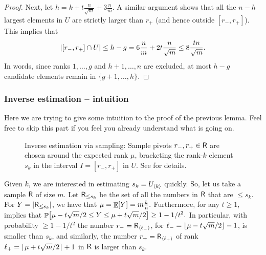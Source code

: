 \begin{proof}
    Next, let $h= k + t \frac{n}{\sqrt{m}} +3\frac{n}{m}$. A similar
    argument shows that all the $n-h$ largest elements in $U$ are
    strictly larger than $r_+$ (and hence outside $[r_-, r_+]$).  This
    implies that
    \begin{equation*}
      \cardin{[r_-, r_+] \cap U} \leq h-g = 6 \frac{n}{m} + 2t
      \frac{n}{\sqrt{m}}%
      \leq%
      8 \frac{tn}{\sqrt{m}}.
  \end{equation*}
  In words, since ranks $1,\dots,g$ and $h+1,\dots,n$ are excluded, at
  most $h-g$ candidate elements remain in $\{g+1,\dots,h\}$.
\end{proof}

\subsubsection{Inverse estimation -- intuition}

Here we are trying to give some intuition to the proof of the previous
lemma. Feel free to skip this part if you feel you already understand
what is going on.

\begin{figure}[t]
    \centering
    \caption{Inverse estimation via sampling: Sample pivots $r_-,
      r_+ \in \mathsf{R}$ are chosen around the expected rank $\mu$,
      bracketing the rank-$k$ element $s_k$ in the interval $I = [r_-,
      r_+]$ in $U$. See  for details.}
\end{figure}


Given $k$, we are interested in estimating $s_k = U_{\langle k\rangle}$
quickly. So, let us take a sample $\mathsf{R}$ of size $m$. Let
$\mathsf{R}_{\leq s_k}$ be the set of all the numbers in $\mathsf{R}$ that
are $\leq s_k$. For $Y = \left| {\mathsf{R}_{\leq s_k}} \right|$, we have that
\begin{math}
  \mu = \mathop{\mathbb{E}}\!\left[ {Y} \right] = m \frac{k}{n}.
\end{math}
Furthermore, for any $t\geq 1$,  implies
that
\begin{math}
    \ds%
    \Prob{ \mu - t \sqrt{m}/2 \leq Y \leq \mu + t \sqrt{m}/2 } \geq 1-
    {1}/{t^2}.
\end{math}
In particular, with probability $\geq 1- 1/t^2$ the number
$r_{-} =\mathsf{R}_{\langle\ell_-\rangle}$, for
$\ell_{-} = \left\lfloor {\mu - t \sqrt{m}/2 } \right\rfloor-1$, is smaller than $s_k$, and
similarly, the number $r_{+} = \mathsf{R}_{\langle\ell_{+}\rangle}$ of rank
$\ell_{+} = \left\lceil {\mu + t \sqrt{m}/2 } \right\rceil+1$ in $\mathsf{R}$ is larger than
$s_k$.

